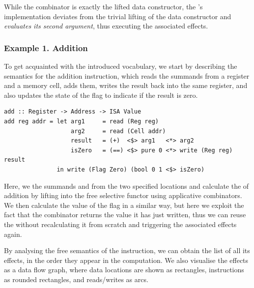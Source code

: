 \noindent
While the  combinator is exactly the lifted  data
constructor, the 's implementation deviates from the trivial lifting
of the  data constructor and \emph{evaluates its second argument},
thus executing the associated effects.

\subsubsection{Example 1. Addition}

To get acquainted with the introduced vocabulary, we start by describing the
semantics for the addition instruction, which reads the summands from a
register and a memory cell, adds them, writes the result back into the same
register, and also updates the state of the  flag to indicate if the
result is zero.

\begin{verbatim}
add :: Register -> Address -> ISA Value
add reg addr = let arg1     = read (Reg reg)
                   arg2     = read (Cell addr)
                   result   = (+)  <$> arg1   <*> arg2
                   isZero   = (==) <$> pure 0 <*> write (Reg reg) result
               in write (Flag Zero) (bool 0 1 <$> isZero)
\end{verbatim}
\vspace{1mm}

\noindent
Here, we  the summands  and  from the two specified
locations and calculate the  of addition by lifting \hs{(+)} into the
free selective functor using applicative combinators. We then calculate the
value of the  flag in a similar way, but here we exploit the fact that
the  combinator returns the value it has just written, thus we can
reuse the  without recalculating it from scratch and triggering the
associated effects again.

By analysing the free semantics of the  instruction, we can obtain the
list of all its effects, in the order they appear in the computation. We also
visualise the effects as a data flow graph, where data locations are shown as
rectangles, instructions as rounded rectangles, and reads/writes as arcs.



